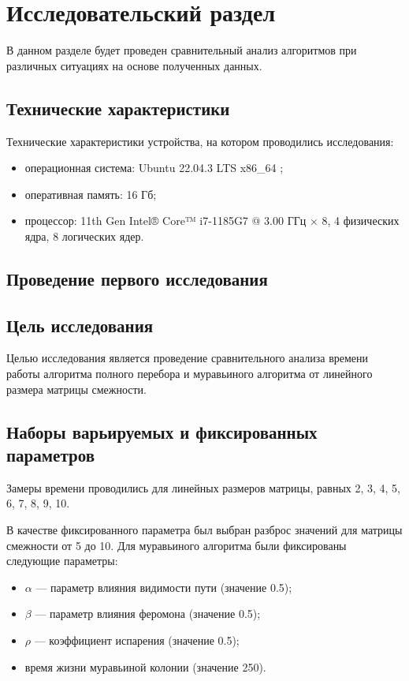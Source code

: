 \chapter{Исследовательский раздел}

В данном разделе будет проведен сравнительный анализ алгоритмов при различных ситуациях на
основе полученных данных.

\section{Технические характеристики}

Технические характеристики устройства, на котором проводились исследования: 

\begin{itemize}[label=--]
	\item операционная система: Ubuntu 22.04.3 LTS x86\_64 \cite{info_os};
	\item оперативная память: 16 Гб;
	\item процессор: 11th Gen Intel® Core™ i7-1185G7 @ 3.00 ГГц × 8, 4 физических ядра, 8 логических ядер.
\end{itemize}

\section{Проведение первого исследования}

\section*{Цель исследования}

Целью исследования является проведение сравнительного анализа времени работы алгоритма полного перебора и муравьиного алгоритма от линейного размера матрицы смежности.

\section*{Наборы варьируемых и фиксированных параметров}

Замеры времени проводились для линейных размеров матрицы, равных 2, 3, 4, 5, 6, 7, 8, 9, 10.

В качестве фиксированного параметра был выбран разброс значений для матрицы смежности от 5 до 10. Для муравьиного алгоритма были фиксированы следующие параметры:

\begin{itemize}[label*=--]
	\item $\alpha$ --- параметр влияния видимости пути (значение 0.5);
	\item $\beta$ --- параметр влияния феромона (значение 0.5);

\clearpage

	\item $\rho$ --- коэффициент испарения (значение 0.5);
	\item время жизни муравьиной колонии (значение 250).
\end{itemize}

